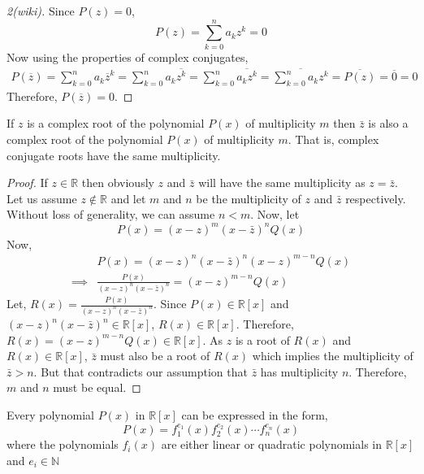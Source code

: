 \begin{proof}[2(wiki)]
    Since $P(z)=0$,
    \begin{equation*}
        P(z) = \sum_{k=0}^{n} a_{k} z^{k} = 0
    \end{equation*}
    Now using the properties of complex conjugates,
    \begin{align*}
        P(\overline{z}) = \sum_{k=0}^{n} a_{k} \overline{z}^{k} 
                        = \sum_{k=0}^{n} a_{k} \overline{z^{k}} 
                        = \sum_{k=0}^{n} \overline{a_{k} z^{k}} 
                        = \overline{\sum_{k=0}^{n} a_{k} z^{k}} 
                        = \overline{P(z)} 
                        = \overline{0} 
                        = 0
    \end{align*}
    Therefore, $P(\overline{z})=0$.
\end{proof}
\begin{corollary}
    If $z$ is a complex root of the polynomial $P(x)$ of multiplicity $m$ then $\bar{z}$ is also 
    a complex root of the polynomial $P(x)$ of multiplicity $m$. That is, complex conjugate roots have 
    the same multiplicity.
\end{corollary}
\begin{proof}
    If $z \in \mathbb{R}$ then obviously $z$ and $\bar{z}$ will have the same multiplicity as $z=\bar{z}$. 
    Let us assume $z \not \in \mathbb{R}$ and let $m$ and $n$ be the multiplicity of $z$ and $\bar{z}$ respectively. 
    Without loss of generality, we can assume $n < m$. Now, let 
    \[
        P(x) = (x-z)^{m}(x-\bar{z})^{n} Q(x)
    \]
    Now,
    \begin{align*}
                 & P(x) = (x-z)^{n}(x-\bar{z})^{n} (x-z)^{m-n} Q(x) \\
        \implies & \frac{P(x)}{(x-z)^{n}(x-\bar{z})^{n}} = (x-z)^{m-n} Q(x)
    \end{align*}
    Let, $R(x) = \frac{P(x)}{(x-z)^{n}(x-\bar{z})^{n}}$. 
    Since $P(x)\in \mathbb{R}[x]$ and $(x-z)^{n}(x-\bar{z})^{n} \in \mathbb{R}[x]$, $R(x) \in \mathbb{R}[x]$. 
    Therefore, $R(x) = (x-z)^{m-n} Q(x) \in \mathbb{R}[x]$. As $z$ is a root of $R(x)$ and $R(x) \in \mathbb{R}[x]$, 
    $\bar{z}$ must also be a root of $R(x)$ which implies the multiplicity of $\bar{z} > n$. But that contradicts our 
    assumption that $\bar{z}$ has multiplicity $n$. Therefore, $m$ and $n$ must be equal.
\end{proof}

\begin{corollary}
    Every polynomial $P(x)$ in $\mathbb{R}[x]$ can be expressed in the form,
    \[
        P(x) = f_{1}^{e_{1}}(x) f_{2}^{e_{2}}(x) \cdots f_{n}^{e_{n}}(x)
    \]
    where the polynomials $f_{i}(x)$ are either linear or quadratic polynomials in $\mathbb{R}[x]$ 
    and $e_{i} \in \mathbb{N}$
\end{corollary}

